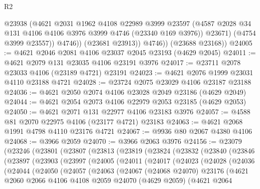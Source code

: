 \begin{lexlean}{R2}
\begin{coremodule}
                  @23938
                  (@4621
                    @2031
                    @1962
                    @4108
                    @22989
                    @3999
                    @23597
                    (@4587 @2028 @34 @131 @4106 @4106 @3976 @3999 @4746 (@23340 @169 @3976))
                    @23671)
                  (@4754 @3999 @23557))
                @4746))
            (@23681 @23913))
          @4746))
      (@23688 @23168))
@24005 := @4621 @2046 @2081 @4106 @23037 @2045 @23193 (@4629 @2045)
@24011 := @4621 @2079 @131 @23035 @4106 @23191 @3976
@24017 := @23711 @2078 @23033 @4106 (@23189 @4721) @23191
@24023 := @4621 @2076 @1999 @23031 @4110 @23188 @4721
@24028 := @23724 @2075 @23029 @4106 @23187 @23188
@24036 := @4621 @2050 @2074 @4106 @23028 @2049 @23186 (@4629 @2049)
@24044 := @4621 @2054 @2073 @4106 @22979 @2053 @23185 (@4629 @2053)
@24050 := @4621 @2071 @131 @22977 @4106 @23183 @3976
@24057 := @4588 @81 @2070 @22975 @4106 (@23177 @4721) @23183
@24063 := @4621 @2068 @1991 @4798 @4110 @23176 @4721
@24067 := @9936 @80 @2067 @4380 @4106
@24068 := @3966 @2059
@24070 := @3966 @2063 @3976
@24156 := @23079
    (@23246
      (@23801
        (@23807
          (@23813
            (@23819
              (@23824
                (@23832
                  (@23840
                    (@23846
                      (@23897
                        (@23903
                          (@23997
                            (@24005
                              (@24011
                                (@24017
                                  (@24023
                                    (@24028
                                      (@24036
                                        (@24044
                                          (@24050
                                            (@24057
                                              (@24063
                                                (@24067
                                                  (@24068 @24070)
                                                  @23176
                                                  (@4621
                                                    @2060
                                                    @2066
                                                    @4106
                                                    @4108
                                                    @2059
                                                    @24070
                                                    (@4629 @2059)
                                                    (@4621
                                                      @2064

\end{coremodule}
\end{lexlean}
